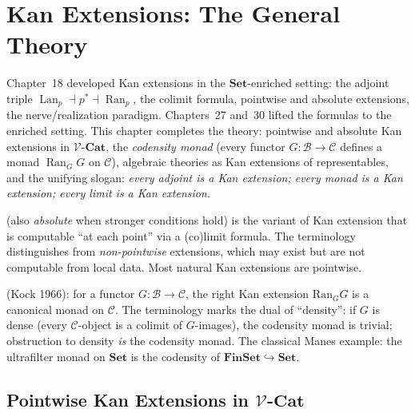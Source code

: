 
\chapter{Kan Extensions: The General Theory}

\begin{overviewbox}
Chapter~18 developed Kan extensions in the $\mathbf{Set}$-enriched setting:
the adjoint triple $\operatorname{Lan}_p \dashv p^* \dashv \operatorname{Ran}_p$,
the colimit formula, pointwise and absolute extensions, the
nerve/realization paradigm. Chapters~27 and~30 lifted the formulas to the
enriched setting. This chapter completes the theory: pointwise and absolute
Kan extensions in $\mathcal{V}$-$\mathbf{Cat}$, the \emph{codensity monad}
(every functor $G : \mathcal{B} \to \mathcal{C}$ defines a monad $\operatorname{Ran}_G G$
on $\mathcal{C}$), algebraic theories as Kan extensions of representables,
and the unifying slogan: \emph{every adjoint is a Kan extension; every monad
is a Kan extension; every limit is a Kan extension.}
\end{overviewbox}


\begin{nameorigin}
 (also \emph{absolute} when stronger
conditions hold) is the variant of Kan extension that is computable
``at each point'' via a (co)limit formula. The terminology distinguishes
from \emph{non-pointwise} extensions, which may exist but are not
computable from local data. Most natural Kan extensions are pointwise.

 (Kock 1966): for a functor $G : \mathcal{B}
\to \mathcal{C}$, the right Kan extension $\mathrm{Ran}_G G$ is a
canonical monad on $\mathcal{C}$. The terminology marks the dual of
``density'': if $G$ is dense (every $\mathcal{C}$-object is a colimit of
$G$-images), the codensity monad is trivial; obstruction to density
\emph{is} the codensity monad. The classical Manes example: the
ultrafilter monad on $\mathbf{Set}$ is the codensity of
$\mathbf{FinSet} \hookrightarrow \mathbf{Set}$.
\end{nameorigin}

\section{Pointwise Kan Extensions in $\mathcal{V}$-$\mathbf{Cat}$}
\label{sec:pointwise-kan}

